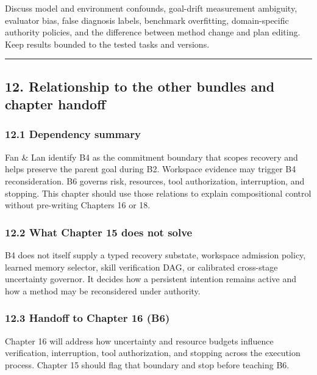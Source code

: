 Discuss model and environment confounds, goal-drift measurement ambiguity, evaluator bias, false diagnosis labels, benchmark overfitting, domain-specific authority policies, and the difference between method change and plan editing. Keep results bounded to the tested tasks and versions.

\begin{center}\rule{0.5\linewidth}{0.5pt}\end{center}

\subsection{12. Relationship to the other bundles and chapter handoff}\label{relationship-to-the-other-bundles-and-chapter-handoff}

\subsubsection{12.1 Dependency summary}\label{dependency-summary}

Fan \& Lan identify B4 as the commitment boundary that scopes recovery and helps preserve the parent goal during B2. Workspace evidence may trigger B4 reconsideration. B6 governs risk, resources, tool authorization, interruption, and stopping. This chapter should use those relations to explain compositional control without pre-writing Chapters 16 or 18.

\subsubsection{12.2 What Chapter 15 does not solve}\label{what-chapter-15-does-not-solve}

B4 does not itself supply a typed recovery substate, workspace admission policy, learned memory selector, skill verification DAG, or calibrated cross-stage uncertainty governor. It decides how a persistent intention remains active and how a method may be reconsidered under authority.

\subsubsection{12.3 Handoff to Chapter 16 (B6)}\label{handoff-to-chapter-16-b6}

Chapter 16 will address how uncertainty and resource budgets influence verification, interruption, tool authorization, and stopping across the execution process. Chapter 15 should flag that boundary and stop before teaching B6.

